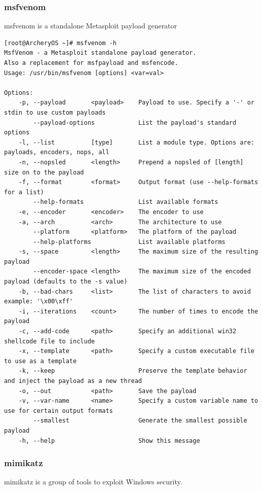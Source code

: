 \documentclass{article}
\begin{document}
\subsubsection{msfvenom}
msfvenom is a standalone Metasploit payload generator
\begin{lstlisting}
[root@ArcheryOS ~]# msfvenom -h
MsfVenom - a Metasploit standalone payload generator.
Also a replacement for msfpayload and msfencode.
Usage: /usr/bin/msfvenom [options] <var=val>

Options:
    -p, --payload       <payload>    Payload to use. Specify a '-' or stdin to use custom payloads
        --payload-options            List the payload's standard options
    -l, --list          [type]       List a module type. Options are: payloads, encoders, nops, all
    -n, --nopsled       <length>     Prepend a nopsled of [length] size on to the payload
    -f, --format        <format>     Output format (use --help-formats for a list)
        --help-formats               List available formats
    -e, --encoder       <encoder>    The encoder to use
    -a, --arch          <arch>       The architecture to use
        --platform      <platform>   The platform of the payload
        --help-platforms             List available platforms
    -s, --space         <length>     The maximum size of the resulting payload
        --encoder-space <length>     The maximum size of the encoded payload (defaults to the -s value)
    -b, --bad-chars     <list>       The list of characters to avoid example: '\x00\xff'
    -i, --iterations    <count>      The number of times to encode the payload
    -c, --add-code      <path>       Specify an additional win32 shellcode file to include
    -x, --template      <path>       Specify a custom executable file to use as a template
    -k, --keep                       Preserve the template behavior and inject the payload as a new thread
    -o, --out           <path>       Save the payload
    -v, --var-name      <name>       Specify a custom variable name to use for certain output formats
        --smallest                   Generate the smallest possible payload
    -h, --help                       Show this message
\end{lstlisting}

\subsubsection{mimikatz}
mimikatz is a group of tools to exploit Windows security.
\begin{lstlisting}
\end{lstlisting}
\end{document}
